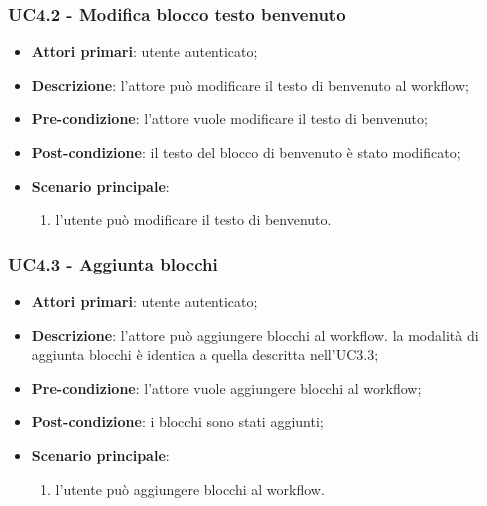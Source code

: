 \subsubsection{UC4.2 - Modifica blocco testo benvenuto}

\begin{itemize}
\item \textbf{Attori primari}: utente autenticato;

\item \textbf{Descrizione}: l'attore può modificare il testo di benvenuto al workflow;

\item \textbf{Pre-condizione}: l'attore vuole modificare il testo di benvenuto;

\item \textbf{Post-condizione}: il testo del blocco di benvenuto è stato modificato;

\item \textbf{Scenario principale}:
\begin{enumerate}
\item l'utente può modificare il testo di benvenuto.
\end{enumerate}
\end{itemize}

\subsubsection{UC4.3 - Aggiunta blocchi}

\begin{itemize}
\item \textbf{Attori primari}: utente autenticato;

\item \textbf{Descrizione}: l'attore può aggiungere blocchi al workflow. la modalità di aggiunta blocchi è identica a quella descritta nell'UC3.3;

\item \textbf{Pre-condizione}: l'attore vuole aggiungere blocchi al workflow;

\item \textbf{Post-condizione}: i blocchi sono stati aggiunti;

\item \textbf{Scenario principale}:
\begin{enumerate}
\item l'utente può aggiungere blocchi al workflow.
\end{enumerate}
\end{itemize}

